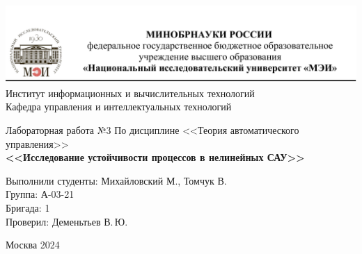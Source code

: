 \begin{titlepage}
	\newpage
	\begin{center}
		\includegraphics[width=\textwidth]{png/tit.png}
		Институт информационных и вычислительных технологий \\
		Кафедра управления и интеллектуальных технологий
		\vspace{1.25cm}
	\end{center}
	
	\vspace{1.2em}
	
	\begin{center}
		\begin{spacing}{1}
			{\Large Лабораторная работа №3\linebreak
				По дисциплине <<Теория автоматического управления>> \\}
			\large{\bf<<Исследование устойчивости процессов в нелинейных САУ>>}
		\end{spacing}
	\end{center}
	
	\vspace{5em}
	
	
	\vspace{6em}
	
	\noindent Выполнили студенты: Михайловский М., Томчук В. \\
	Группа: А-03-21 \\
	Бригада: 1\\
	Проверил: Деменьтьев В.\,Ю.
	
	
	\vspace{\fill}
	
	\begin{center}
		Москва 2024
	\end{center}
	
\end{titlepage}